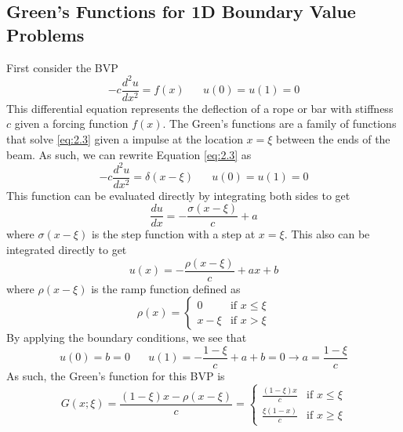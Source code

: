 \documentclass{article}
\newcommand{\od}[2]{\frac{d #1}{d #2}}
\newcommand{\odt}[2]{\frac{d^2 #1}{d #2 ^2}}
\numberwithin{equation}{section}
\begin{document}
\subsection{Green's Functions for 1D Boundary Value Problems}
First consider the BVP 
\begin{equation}
    -c\odt{u}{x}=f(x) \hspace{20pt} u(0)=u(1)=0 \label{eq:2.3}
\end{equation}
This differential equation represents the deflection of a rope or bar with stiffness $c$ given a forcing function $f(x)$. The Green's functions are a family of functions that solve \eqref{eq:2.3} given a impulse at the location $x=\xi$ between the ends of the beam. As such, we can rewrite Equation \eqref{eq:2.3} as
\begin{equation}
    -c\odt{u}{x}=\delta(x-\xi) \hspace{20pt} u(0)=u(1)=0\label{eq:2.4}
\end{equation}
This function can be evaluated directly by integrating both sides to get 
\begin{equation*}
    \od{u}{x}=-\frac{\sigma(x-\xi)}{c}+a
\end{equation*}
where $\sigma(x-\xi)$ is the step function with a step at $x=\xi$. This also can be integrated directly to get 
\begin{equation}
    u(x)=-\frac{\rho(x-\xi)}{c}+ax+b \label{eq:2.5}
\end{equation}
where $\rho(x-\xi)$ is the ramp function defined as 
\begin{equation*}
    \rho(x) = 
    \begin{cases}
        0 & \text{if } x\leq \xi \\
        x-\xi & \text{if } x > \xi
    \end{cases}
\end{equation*}
By applying the boundary conditions, we see that 
\begin{equation*}
    u(0)=b=0 \hspace{20pt} u(1) =-\frac{1-\xi}{c}+a+b=0 \rightarrow a=\frac{1-\xi}{c}
\end{equation*}
As such, the Green's function for this BVP is 
\begin{equation}
   G(x;\xi) = \frac{(1-\xi)x-\rho(x-\xi)}{c} = 
   \begin{cases}
       \frac{(1-\xi)x}{c} & \text{if } x\leq\xi \\
       \frac{\xi(1-x)}{c} & \text{if }x \geq \xi
   \end{cases}\label{eq:2.6}
\end{equation}
\end{document}
